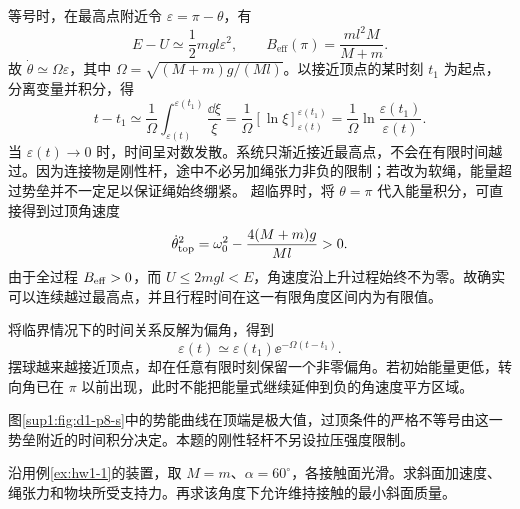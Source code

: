 \begin{solution}
等号时，在最高点附近令 $\varepsilon=\pi-\theta$，有
\[
E-U\simeq\frac12mgl\varepsilon^2,\qquad
B_{\text{eff}}(\pi)=\frac{ml^2M}{M+m}.
\]
故 $\dot\theta\simeq\Omega\varepsilon$，其中 $\Omega=\sqrt{(M+m)g/(Ml)}$。以接近顶点的某时刻 $t_1$ 为起点，分离变量并积分，得
\[
t-t_1\simeq\frac1\Omega\int_{\varepsilon(t)}^{\varepsilon(t_1)}\frac{\dd\xi}{\xi}
=\frac1\Omega[\ln\xi]_{\varepsilon(t)}^{\varepsilon(t_1)}
=\frac1\Omega\ln\frac{\varepsilon(t_1)}{\varepsilon(t)}.
\]
当 $\varepsilon(t)\to0$ 时，时间呈对数发散。系统只渐近接近最高点，不会在有限时间越过。因为连接物是刚性杆，途中不必另加绳张力非负的限制；若改为软绳，能量超过势垒并不一定足以保证绳始终绷紧。
超临界时，将 $\theta=\pi$ 代入能量积分，可直接得到过顶角速度
\[
\dot\theta_{\rm top}^2=
\omega_0^2-\frac{4(M+m)g}{Ml}>0.
\]
由于全过程 $B_{\rm eff}>0$，而 $U\le2mgl<E$，角速度沿上升过程始终不为零。故确实可以连续越过最高点，并且行程时间在这一有限角度区间内为有限值。

将临界情况下的时间关系反解为偏角，得到
\[
\varepsilon(t)\simeq\varepsilon(t_1)\ee^{-\Omega(t-t_1)}.
\]
摆球越来越接近顶点，却在任意有限时刻保留一个非零偏角。若初始能量更低，转向角已在 $\pi$ 以前出现，此时不能把能量式继续延伸到负的角速度平方区域。

图\ref{sup1:fig:d1-p8-s}中的势能曲线在顶端是极大值，过顶条件的严格不等号由这一势垒附近的时间积分决定。本题的刚性轻杆不另设拉压强度限制。

\end{solution}


\begin{exercise}[牵连斜面的接触余量]\label{deep1:problem-exercise-3}\label{deep1:exercise:d1-p3}
沿用例\ref{ex:hw1-1}的装置，取 $M=m$、$\alpha=60^\circ$，各接触面光滑。求斜面加速度、绳张力和物块所受支持力。再求该角度下允许维持接触的最小斜面质量。
\end{exercise}

